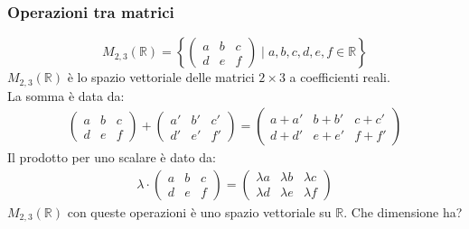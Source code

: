 \documentclass[a4paper]{article}
\theoremstyle{definition}
\begin{document}
\subsubsection{Operazioni tra matrici}
\[ M_{2,3}(\mathbb{R}) = \left\{ \begin{pmatrix}
		a & b & c \\
		d & e & f
	\end{pmatrix} \mid a, b, c, d, e, f \in \mathbb{R} \right\} \]
$M_{2,3}(\mathbb{R})$ è lo spazio vettoriale delle matrici $2 \times 3$ a coefficienti reali. \\
La somma è data da:
\begin{align*}
	\begin{pmatrix}
		a & b & c \\
		d & e & f
	\end{pmatrix} + \begin{pmatrix}
		a' & b' & c' \\
		d' & e' & f'
	\end{pmatrix} = \begin{pmatrix}
		a + a' & b + b' & c + c' \\
		d + d' & e + e' & f + f'
	\end{pmatrix}
\end{align*}
Il prodotto per uno scalare è dato da:
\begin{align*}
	\lambda \cdot \begin{pmatrix}
		a & b & c \\
		d & e & f
	\end{pmatrix} = \begin{pmatrix}
		\lambda a & \lambda b & \lambda c \\
		\lambda d & \lambda e & \lambda f
	\end{pmatrix}
\end{align*}
$M_{2,3}(\mathbb{R})$ con queste operazioni è uno spazio vettoriale su $\mathbb{R}$. Che dimensione ha?
\end{document}
